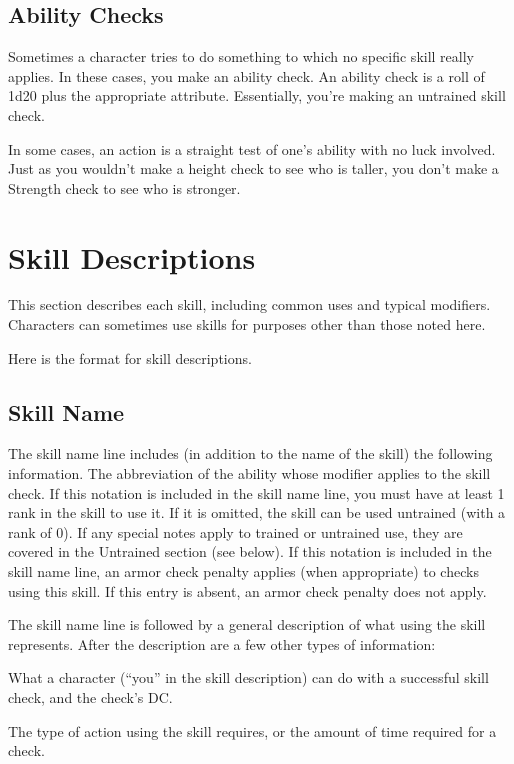 \subsection{Ability Checks}
Sometimes a character tries to do something to which no specific skill really applies. In these cases, you make an ability check. An ability check is a roll of 1d20 plus the appropriate attribute. Essentially, you're making an untrained skill check.

In some cases, an action is a straight test of one's ability with no luck involved. Just as you wouldn't make a height check to see who is taller, you don't make a Strength check to see who is stronger.

\section{Skill Descriptions}
This section describes each skill, including common uses and typical modifiers. Characters can sometimes use skills for purposes other than those noted here.

Here is the format for skill descriptions.

\subsection*{Skill Name}
The skill name line includes (in addition to the name of the skill) the following information.
 The abbreviation of the ability whose modifier applies to the skill check.
 If this notation is included in the skill name line, you must have at least 1 rank in the skill to use it. If it is omitted, the skill can be used untrained (with a rank of 0). If any special notes apply to trained or untrained use, they are covered in the Untrained section (see below).
 If this notation is included in the skill name line, an armor check penalty applies (when appropriate) to checks using this skill. If this entry is absent, an armor check penalty does not apply.

\par The skill name line is followed by a general description of what using the skill represents. After the description are a few other types of information:

 What a character (``you'' in the skill description) can do with a successful skill check, and the check's DC.

 The type of action using the skill requires, or the amount of time required for a check.


